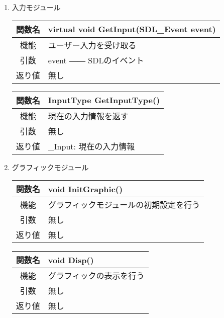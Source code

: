\documentclass{jarticle}
\begin{document}
\begin{enumerate}
    \item 入力モジュール
    \begin{table}[H]
        \label{table:fanc_c4-1}
        \begin{center}
            \begin{tabular}{|c||p{30em}|}\hline
                関数名&virtual void GetInput(SDL\_Event event)\\\hline
                機能&ユーザー入力を受け取る\\
                引数&event ―― SDLのイベント\\
                返り値&無し\\\hline
            \end{tabular}
        \end{center}
    \end{table}
    \begin{table}[H]
        \label{table:fanc_c4-2}
        \begin{center}
            \begin{tabular}{|c||p{30em}|}\hline
                関数名&InputType GetInputType()\\\hline
                機能&現在の入力情報を返す\\
                引数&無し\\
                返り値&\_Input: 現在の入力情報\\\hline
            \end{tabular}
        \end{center}
    \end{table}
    \item グラフィックモジュール
    \begin{table}[H]
        \label{table:fanc_c5-1}
        \begin{center}
            \begin{tabular}{|c||p{30em}|}\hline
                関数名&void InitGraphic()\\\hline
                機能&グラフィックモジュールの初期設定を行う\\
                引数&無し\\
                返り値&無し\\\hline
            \end{tabular}
        \end{center}
    \end{table}
    \begin{table}[H]
        \label{table:fanc_c5-1}
        \begin{center}
            \begin{tabular}{|c||p{30em}|}\hline
                関数名&void Disp()\\\hline
                機能&グラフィックの表示を行う\\
                引数&無し\\
                返り値&無し\\\hline
            \end{tabular}
        \end{center}
    \end{table}
    
\end{enumerate}
\end{document}
